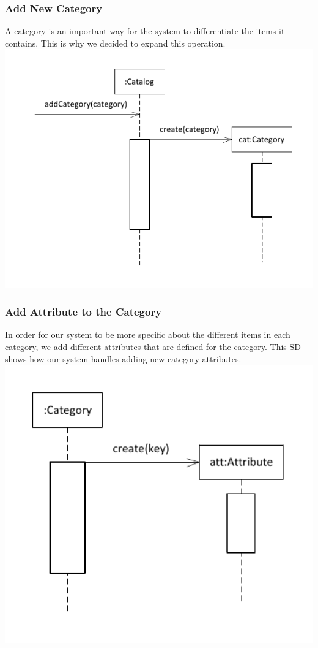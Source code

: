 \documentclass{article}
\begin{document}
\subsubsection{Add New Category}
A category is an important way for the system to differentiate the items it contains.  This is why we decided to expand this operation.\\
\includegraphics[keepaspectratio, width=6in]{sd_catalog_add_category.pdf}\\
\subsubsection{Add Attribute to the Category}
In order for our system to be more specific about the different items in each category, we add different attributes that are defined for the category.  This SD shows how our system handles adding new category attributes.\\
\includegraphics[keepaspectratio, width=6in]{sd_category_add_attribute.pdf}\\
\end{document}
